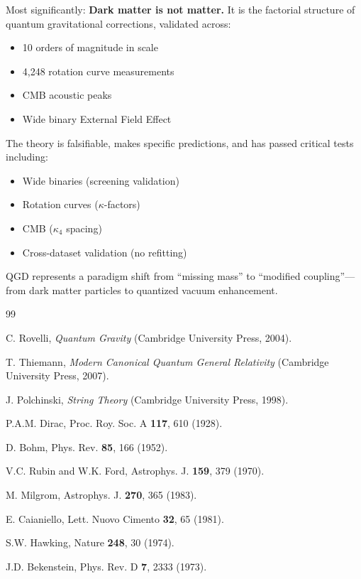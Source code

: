 \documentclass[11pt,a4paper]{article}
\theoremstyle{definition}
\theoremstyle{remark}
\begin{document}
	Most significantly: \textbf{Dark matter is not matter.} It is the factorial structure of quantum gravitational corrections, validated across:
	\begin{itemize}
		\item 10 orders of magnitude in scale
		\item 4,248 rotation curve measurements
		\item CMB acoustic peaks
		\item Wide binary External Field Effect
	\end{itemize}
	
	The theory is falsifiable, makes specific predictions, and has passed critical tests including:
	\begin{itemize}
		\item Wide binaries (screening validation)
		\item Rotation curves ($\kappa$-factors)
		\item CMB ($\kappa_4$ spacing)
		\item Cross-dataset validation (no refitting)
	\end{itemize}
	
	QGD represents a paradigm shift from ``missing mass'' to ``modified coupling''---from dark matter particles to quantized vacuum enhancement.
	
	\begin{thebibliography}{99}
		
		C. Rovelli, \emph{Quantum Gravity} (Cambridge University Press, 2004).
		
		T. Thiemann, \emph{Modern Canonical Quantum General Relativity} (Cambridge University Press, 2007).
		
		J. Polchinski, \emph{String Theory} (Cambridge University Press, 1998).
		
		P.A.M. Dirac, Proc. Roy. Soc. A \textbf{117}, 610 (1928).
		
		D. Bohm, Phys. Rev. \textbf{85}, 166 (1952).
		
		V.C. Rubin and W.K. Ford, Astrophys. J. \textbf{159}, 379 (1970).
		
		M. Milgrom, Astrophys. J. \textbf{270}, 365 (1983).
		
		E. Caianiello, Lett. Nuovo Cimento \textbf{32}, 65 (1981).
		
		S.W. Hawking, Nature \textbf{248}, 30 (1974).
		
		J.D. Bekenstein, Phys. Rev. D \textbf{7}, 2333 (1973).
		
	\end{thebibliography}
	
\end{document}
